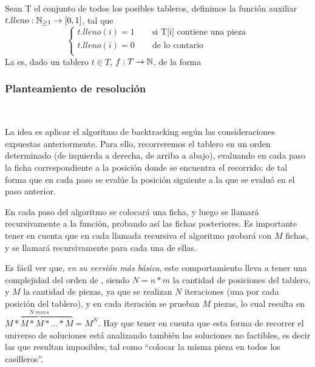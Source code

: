 \documentclass[11pt, a4paper, twoside]{article}
\begin{document}
\begin{paragraph}
\begin{definicion}\label{def:ej3-objetivo}
Sean T el conjunto de todos los posibles tableros, 
definimos la función auxiliar 
$t.lleno: \mathbb{N}_{\geq 1} \rightarrow [0,1]$, tal que
\[
  \left\lbrace
  \begin{array}{l}
     t.lleno(i) = 1 ~~~~~~~~ \text{ si T[i] contiene una pieza} \\
     t.lleno(i) = 0 ~~~~~~~~ \text{ de lo contario} \\
  \end{array}
  \right.
\]
La  es, dado un tablero $t \in T$,
$f: T \rightarrow \mathbb{N}$, de la forma
\blue{
\[
f(T) := \nsum_{i=1}^{\#casilleros}{ t.lleno \bigg( {\large T\left(i\right)} \bigg) }
\]
}
\end{definicion}

\end{paragraph}

\subsubsection{Planteamiento de resolución}\label{subsubsec:ej3-resolucion}

\begin{paragraph}\


La idea es aplicar el algoritmo de backtracking según las consideraciones
expuestas anteriormente. Para ello, recorreremos el tablero en un orden
determinado (de izquierda a derecha, de arriba a abajo), evaluando en cada
paso la ficha correspondiente a la posición donde se encuentra el recorrido:
de tal forma que en cada paso se evalúe la posición siguiente a la que se
evaluó en el paso anterior.

En cada paso del algoritmo se colocará una ficha, y luego se llamará
recursivamente a la función, probando así las fichas posteriores. Es
importante tener en cuenta que en cada llamada recursiva el algoritmo probará
con $M$ fichas, y se llamará recursivamente para cada una de ellas.

Es fácil ver que, \emph{en su versión más básica}, este comportamiento lleva a
tener una complejidad del orden de , siendo $N=n*m$ la cantidad de
posiciones del tablero, y $M$ la cantidad de piezas, ya que se realizan $N$
iteraciones (una por cada posición del tablero), y en cada iteración se
prueban $M$ piezas, lo cual resulta en $\overbrace{M*M*M*...*M}^{N~veces} =
M^N$. Hay que tener en cuenta que esta forma de recorrer el universo de
soluciones está analizando también las soluciones no factibles, es decir las
que resultan imposibles, tal como ``colocar la misma pieza en todos los
casilleros''.

\end{paragraph}
\end{document}

